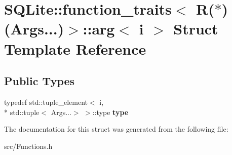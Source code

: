 \hypertarget{struct_s_q_lite_1_1function__traits_3_01_r_07_5_08_07_args_8_8_8_08_4_1_1arg}{\section{S\-Q\-Lite\-:\-:function\-\_\-traits$<$ R($\ast$)(Args...)$>$\-:\-:arg$<$ i $>$ Struct Template Reference}
\label{struct_s_q_lite_1_1function__traits_3_01_r_07_5_08_07_args_8_8_8_08_4_1_1arg}
}
\subsection*{Public Types}
\begin{DoxyCompactItemize}
\item 
\hypertarget{struct_s_q_lite_1_1function__traits_3_01_r_07_5_08_07_args_8_8_8_08_4_1_1arg_a4f793702bdbf828c51c2d891df8bb8ce}{typedef std\-::tuple\-\_\-element$<$ i, \\*
std\-::tuple$<$ Args...$>$ $>$\-::type {\bfseries type}}\label{struct_s_q_lite_1_1function__traits_3_01_r_07_5_08_07_args_8_8_8_08_4_1_1arg_a4f793702bdbf828c51c2d891df8bb8ce}

\end{DoxyCompactItemize}


The documentation for this struct was generated from the following file\-:\begin{DoxyCompactItemize}
\item 
src/Functions.\-h\end{DoxyCompactItemize}
